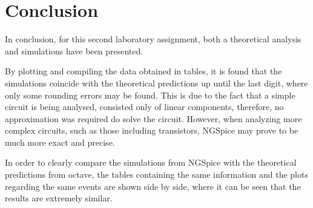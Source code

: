 \section{Conclusion}
\label{sec:conclusion}

In conclusion, for this second laboratory assignment, both a theoretical analysis and simulations have been presented. \par
By plotting and compiling the data obtained in tables, it is found that the simulations coincide with the theoretical predictions up until the last digit, where only some rounding errors may be found. This is due to the fact that a simple circuit is being analysed, consisted only of linear components, therefore, no approximation was required do solve the circuit. However, when analyzing more complex circuits, such as those including transistors, NGSpice may prove to be much more exact and precise. \par
In order to clearly compare the simulations from NGSpice with the theoretical predictions from octave, the tables containing the same information and the plots regarding the same events are shown side by side, where it can be seen that the results are extremely similar.


